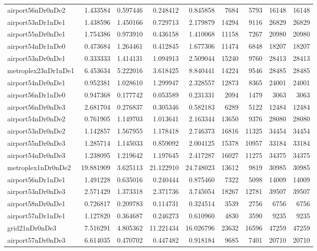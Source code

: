 \begin{longtable}{|l|r|r|r|r|r|r|r|r|}
airport56nDr0nDe2 & 1.433584 & 0.597446 & 0.248412 & 0.845858 & 7684 & 5793 & 16148 & 16148 \\
airport53nDr1nDe1 & 1.438596 & 1.450166 & 0.729713 & 2.179879 & 14294 & 9116 & 26829 & 26829 \\
airport55nDr0nDe1 & 1.754386 & 0.973910 & 0.436158 & 1.410068 & 11158 & 7267 & 20980 & 20980 \\
airport54nDr1nDe0 & 0.473684 & 1.264461 & 0.412845 & 1.677306 & 11474 & 6848 & 18207 & 18207 \\
airport53nDr0nDe1 & 0.333333 & 1.414131 & 1.094913 & 2.509044 & 15240 & 9760 & 28413 & 28413 \\
metroplex23nDr1nDe1 & 6.453634 & 5.222016 & 3.618425 & 8.840441 & 14224 & 9546 & 28485 & 28485 \\
airport54nDr0nDe1 & 0.952381 & 1.028610 & 1.299947 & 2.328557 & 12873 & 8365 & 24001 & 24001 \\
airport56nDr1nDe0 & 0.947368 & 0.177742 & 0.053589 & 0.231331 & 2094 & 1479 & 3063 & 3063 \\
airport56nDr0nDe3 & 2.681704 & 0.276837 & 0.305346 & 0.582183 & 6289 & 5122 & 12484 & 12484 \\
airport54nDr0nDe2 & 0.761905 & 1.149703 & 1.013641 & 2.163344 & 13650 & 9376 & 28080 & 28080 \\
airport53nDr0nDe2 & 1.142857 & 1.567955 & 1.178418 & 2.746373 & 16816 & 11325 & 34454 & 34454 \\
airport55nDr0nDe3 & 1.285714 & 1.145033 & 0.859092 & 2.004125 & 15378 & 10957 & 33184 & 33184 \\
airport54nDr0nDe3 & 1.238095 & 1.219642 & 1.197645 & 2.417287 & 16027 & 11275 & 34375 & 34375 \\
metroplex1nDr0nDe2 & 19.881909 & 3.625113 & 21.122910 & 24.748023 & 13612 & 9819 & 30985 & 30985 \\
airport56nDr1nDe1 & 1.491228 & 0.635016 & 0.240444 & 0.875460 & 7322 & 5098 & 14009 & 14009 \\
airport53nDr0nDe3 & 2.571429 & 1.373318 & 2.371736 & 3.745054 & 18267 & 12781 & 39507 & 39507 \\
airport58nDr0nDe1 & 0.726817 & 0.209783 & 0.114731 & 0.324514 & 3539 & 2756 & 6756 & 6756 \\
airport57nDr1nDe1 & 1.127820 & 0.364687 & 0.246273 & 0.610960 & 4830 & 3590 & 9235 & 9235 \\
grid21nDr0nDe3 & 7.516291 & 4.805362 & 11.221434 & 16.026796 & 23632 & 16596 & 47259 & 47259 \\
airport57nDr0nDe3 & 6.614035 & 0.470702 & 0.447482 & 0.918184 & 9685 & 7401 & 20710 & 20710 \\

\end{longtable}
